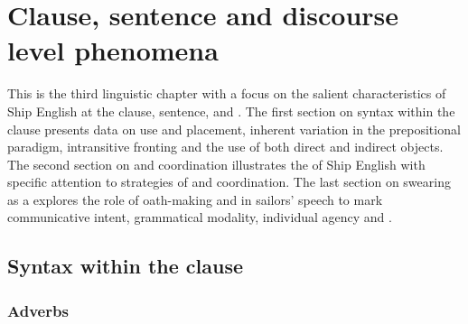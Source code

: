 \chapter{{Clause, sentence and discourse level phenomena}}\label{sec:7}

This is the third linguistic chapter with a focus on the salient characteristics of Ship English at the clause, sentence, and . The first section on syntax within the clause presents data on  use and placement, inherent variation in the prepositional paradigm, intransitive  fronting and the use of both direct and indirect objects. The second section on  and coordination illustrates the  of Ship English with specific attention to strategies of  and coordination. The last section on swearing as a  explores the role of oath-making and  in sailors’ speech to mark communicative intent, grammatical modality, individual agency and . 

\section{{Syntax within the clause}}%

\subsection{{Adverbs}}%

